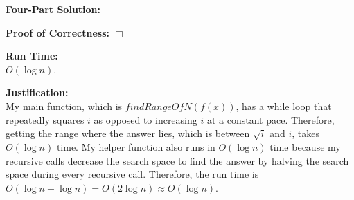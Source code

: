 \documentclass[11pt]{article}
\def\endproofmark{$\Box$}
\newenvironment{FourPartSolution}{\par{\bf Four-Part Solution:}}{\smallskip}
\newenvironment{proofOfCorrectness}{\par{\bf Proof of Correctness:}}{\endproofmark\smallskip}
\newenvironment{runTime}{\par{\bf Run Time:}}{\smallskip}
\newenvironment{justification}{\par{\bf Justification:}}{\smallskip}
\begin{document}
\begin{FourPartSolution}
\begin{proofOfCorrectness}
\end{proofOfCorrectness}
\\
\begin{runTime}
\\
$O(\log{n})$.
\end{runTime}
\\
\begin{justification}
\\
My main function, which is $findRangeOfN(f(x))$, has a while loop that repeatedly squares $i$ as opposed to increasing $i$ at a constant pace. Therefore, getting the range where the answer lies, which is between $\sqrt{i}$ and $i$, takes $O(\log{n})$ time. My helper function also runs in $O(\log{n})$ time because my recursive calls decrease the search space to find the answer by halving the search space during every recursive call. Therefore, the run time is $O(\log{n} + \log{n}) = O(2\log{n}) \approx O(\log{n})$.
\end{justification}
\end{FourPartSolution}



\newpage
\end{document}
